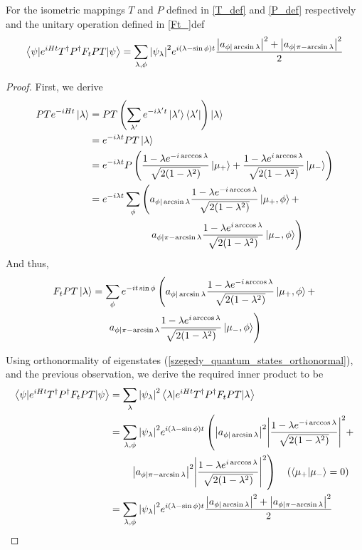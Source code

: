 \documentclass[
10pt, %
a4paper, %
oneside, %
headinclude,footinclude, %
BCOR5mm, %
]{scrartcl}
\begin{document}
\begin{theorem}\label{inner_product_derivation}
For the isometric mappings $T$ and $P$ defined in \ref{T_def} and \ref{P_def} respectively and the unitary operation defined in \ref{Ft_}def
$$\left<\psi|e^{iHt}T^{\dagger}P^{\dagger}F_tPT|\psi\right>=\sum_{\lambda,\phi}\abs{\psi_\lambda}^2e^{i(\lambda-\sin\phi)t}\frac{\abs{a_{\phi|\arcsin\lambda}}^2+\abs{a_{\phi|\pi-\arcsin\lambda}}^2}{2}
$$
\end{theorem}
\begin{proof}
First, we derive
\begin{align*}
PTe^{-iHt}\ket\lambda&=PT\left(\sum_{\lambda'}e^{-i\lambda't}\ket{\lambda'}\bra{\lambda'}\right)\ket\lambda\\
&=e^{-i\lambda t}PT\ket\lambda\\
&=e^{-i\lambda t}P\left(\frac{1-\lambda e^{-i\arccos\lambda}}{\sqrt{2(1-\lambda^2)}}\ket{\mu_+}+\frac{1-\lambda e^{i\arccos\lambda}}{\sqrt{2(1-\lambda^2)}}\ket{\mu_-}\right)\\
&=e^{-i\lambda t}\sum_\phi\left(a_{\phi|\arcsin\lambda}\frac{1-\lambda e^{-i\arccos\lambda}}{\sqrt{2(1-\lambda^2)}}\ket{\mu_+,\phi}+\right.\\
&\qquad\qquad\qquad \left.a_{\phi|\pi-\arcsin\lambda}\frac{1-\lambda e^{i\arccos\lambda}}{\sqrt{2(1-\lambda^2)}}\ket{\mu_-,\phi}\right)\end{align*}
And thus,
\begin{multline*}
F_tPT\ket\lambda=\sum_\phi e^{-it\sin\phi}\left(a_{\phi|\arcsin\lambda}\frac{1-\lambda e^{-i\arccos\lambda}}{\sqrt{2(1-\lambda^2)}}\ket{\mu_+,\phi}+\right.\\
\left.a_{\phi|\pi-\arcsin\lambda}\frac{1-\lambda e^{i\arccos\lambda}}{\sqrt{2(1-\lambda^2)}}\ket{\mu_-,\phi}\right)
\end{multline*}

Using orthonormality of eigenstates (\ref{szegedy_quantum_states_orthonormal}), and the previous observation, we derive the required inner product to be
\begin{align*}
\left<\psi|e^{iHt}T^{\dagger}P^{\dagger}F_tPT|\psi\right>&=\sum_\lambda\abs{\psi_\lambda}^2\left<\lambda|e^{iHt}T^{\dagger}P^{\dagger}F_tPT|\lambda\right>\\
&=\sum_{\lambda,\phi}\abs{\psi_\lambda}^2e^{i(\lambda-\sin\phi)t}\left(\abs{a_{\phi|\arcsin\lambda}}^2\abs{\frac{1-\lambda e^{-i\arccos\lambda}}{\sqrt{2(1-\lambda^2)}}}^2+\right.\\
&\qquad\left.\abs{a_{\phi|\pi-\arcsin\lambda}}^2\abs{\frac{1-\lambda e^{i\arccos\lambda}}{\sqrt{2(1-\lambda^2)}}}^2\right)\ \ \ (\braket{\mu_+}{\mu_-}=0)\\
&=\sum_{\lambda,\phi}\abs{\psi_\lambda}^2e^{i(\lambda-\sin\phi)t}\frac{\abs{a_{\phi|\arcsin\lambda}}^2+\abs{a_{\phi|\pi-\arcsin\lambda}}^2}{2}
\end{align*}
\end{proof}
\end{document}
